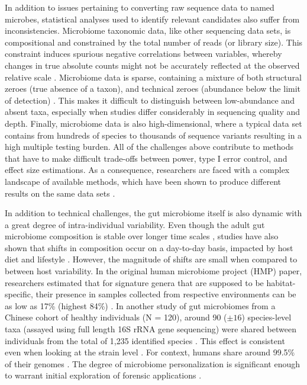 In addition to issues pertaining to converting raw sequence data to named microbes, statistical analyses used to identify relevant candidates also suffer from inconsistencies. Microbiome taxonomic data, like other sequencing data sets, is compositional \cite{gloor2017microbiome, quinn2019field} and constrained by the total number of reads (or library size). This constraint induces spurious negative correlations between variables, whereby changes in true absolute counts might not be accurately reflected at the observed relative scale \cite{lin2020analysis, morton2019establishing}. Microbiome data is sparse, containing a mixture of both structural zeroes (true absence of a taxon), and technical zeroes (abundance below the limit of detection) \cite{kaul2017analysis, silverman2020naught}. This makes it difficult to distinguish between low-abundance and absent taxa, especially when studies differ considerably in sequencing quality and depth. Finally, microbiome data is also high-dimensional, where a typical data set contains from hundreds of species to thousands of sequence variants resulting in a high multiple testing burden. All of the challenges above contribute to methods that have to make difficult trade-offs between power, type I error control, and effect size estimations. As a consequence, researchers are faced with a complex landscape of available methods, which have been shown to produce different results on the same data sets \cite{nearing2022microbiome}.   

In addition to technical challenges, the gut microbiome itself is also dynamic with a great degree of intra-individual variability. Even though the adult gut microbiome composition is stable over longer time scales \cite{consortium2012structure}, studies have also shown that shifts in composition occur on a day-to-day basis, impacted by host diet and lifestyle \cite{david2014host, david2014diet}. However, the magnitude of shifts are small when compared to between host variability. In the original human microbiome project (HMP) paper, researchers estimated that for signature genera that are supposed to be habitat-specific, their presence in samples collected from respective environments can be as low as 17\% (highest 84\%) \cite{consortium2012structure}. In another study of gut microbiomes from a Chinese cohort of healthy individuals (N = 120), around 90 ($\pm 16$) species-level taxa (assayed using full length 16S rRNA gene sequencing) were shared between individuals from the total of 1,235 identified species \cite{yang2020specieslevel}. This effect is consistent even when looking at the strain level \cite{lloyd-price2017strains}. For context, humans share around 99.5\% of their genomes \cite{nationalhumangenomeresearchinstitutegenetics}. The degree of microbiome personalization is significant enough to warrant initial exploration of forensic applications \cite{fierer2010forensic}. 


